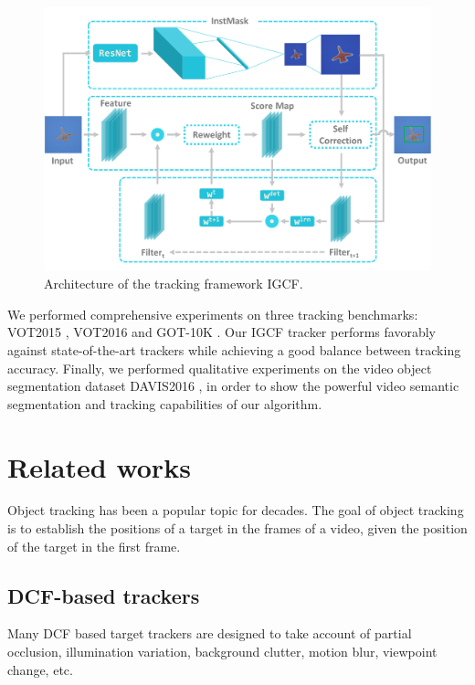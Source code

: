 \documentclass[review]{elsarticle}
\begin{document}
\begin{CJK*}{UTF8}{gbsn}
\begin{figure}
    \centering
    \includegraphics[width=12cm]{images/instmask1.pdf}
    \caption{Architecture of the tracking framework IGCF.}
    \label{fig:IGCF}
\end{figure}

We performed comprehensive experiments on three tracking benchmarks: VOT2015 \cite{Kristan2015TheVO}, VOT2016 \cite{Kristan2016TheVO} and GOT-10K \cite{Huang2018GOT10kAL}. Our IGCF tracker performs favorably against state-of-the-art trackers while achieving a good balance between tracking accuracy. Finally, we performed qualitative experiments on the video object segmentation dataset DAVIS2016 \cite{Perazzi2016}, in order to show the powerful video semantic segmentation and tracking capabilities of our algorithm.

\section{Related works}
Object tracking has been a popular topic for decades. The goal of object tracking is to establish the positions of a target in the frames of a video, given the position of the target in the first frame.

\subsection{DCF-based trackers}
Many DCF based target trackers are designed to take account of partial occlusion, illumination variation, background clutter, motion blur, viewpoint change, etc.


\end{CJK*}
\end{document}
